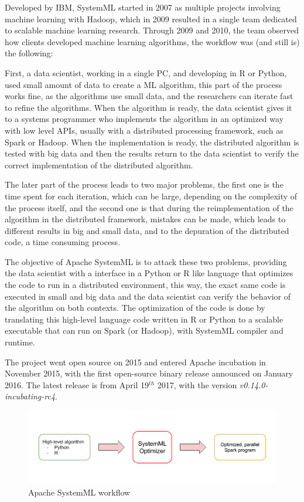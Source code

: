 \documentclass[11pt]{book} %
\begin{document}
    Developed by IBM, SystemML started in 2007 as multiple projects involving machine learning with Hadoop, which in 2009 resulted in a single team dedicated to scalable machine learning research. Through 2009 and 2010, the team observed how clients developed machine learning algorithms, the workflow was (and still is) the following:

    First, a data scientist, working in a single PC, and developing in R or Python, used small amount of data to create a ML algorithm, this part of the process works fine, as the algorithms use small data, and the researchers can iterate fast to refine the algorithms. When the algorithm is ready, the data scientist gives it to a systems programmer who implements the algorithm in an optimized way with low level APIs, usually with a distributed processing framework, such as Spark or Hadoop. When the implementation is ready, the distributed algorithm is tested with big data and then the results return to the data scientist to verify the correct implementation of the distributed algorithm.

    The later part of the process leads to two major problems, the first one is the time spent for each iteration, which can be large, depending on the complexity of the process itself, and the second one is that during the reimplementation of the algorithm in the distributed framework, mistakes can be made, which leads to different results in big and small data, and to the depuration of the distributed code, a time consuming process.

    The objective of Apache SystemML is to attack these two problems, providing the data scientist with a interface in a Python or R like language that optimizes the code to run in a distributed environment, this way, the exact same code is executed in small and big data and the data scientist can verify the behavior of the algorithm on both contexts. The optimization of the code is done by translating this high-level language code written in R or Python to a scalable executable that can run on Spark (or Hadoop), with SystemML compiler and runtime.

    The project went open source on 2015 and entered Apache incubation in November 2015, with the first open-source binary release announced on January 2016. The latest release is from April 19$^{th}$ 2017, with the version \emph{v0.14.0-incubating-rc4}.

    \begin{figure}[!ht]
      \centering
      \includegraphics[width=\textwidth]{systemml_objective.png}
      \caption{Apache SystemML workflow}
      \label{img:systemml_workflow}
    \end{figure}
\end{document}
